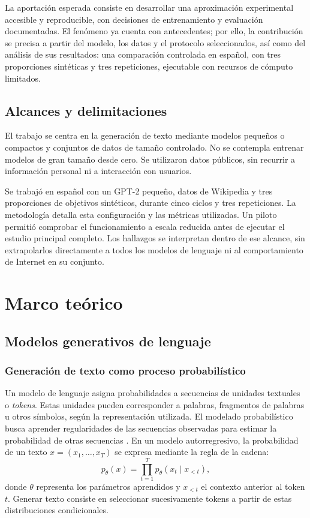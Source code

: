 \documentclass[12pt,letterpaper]{article}
\begin{document}
La aportación esperada consiste en desarrollar una aproximación experimental
accesible y reproducible, con decisiones de entrenamiento y evaluación
documentadas. El fenómeno ya cuenta con antecedentes; por ello, la
contribución se precisa a partir del modelo, los datos y el protocolo
seleccionados, así como del análisis de sus resultados: una comparación
controlada en español, con tres proporciones sintéticas y tres repeticiones,
ejecutable con recursos de cómputo limitados.

\subsection{Alcances y delimitaciones}

El trabajo se centra en la generación de texto mediante modelos pequeños o
compactos y conjuntos de datos de tamaño controlado. No se contempla
entrenar modelos de gran tamaño desde cero. Se utilizaron datos
públicos, sin recurrir a información personal
ni a interacción con usuarios.

Se trabajó en español con un GPT-2 pequeño, datos de Wikipedia y
tres proporciones de objetivos sintéticos, durante cinco ciclos y tres
repeticiones. La metodología detalla esta configuración y las métricas
utilizadas. Un piloto permitió comprobar el funcionamiento a escala reducida
antes de ejecutar el estudio principal completo. Los hallazgos se interpretan dentro de ese alcance,
sin extrapolarlos directamente a todos los modelos de lenguaje ni al
comportamiento de Internet en su conjunto.

\section{Marco teórico}

\subsection{Modelos generativos de lenguaje}

\subsubsection{Generación de texto como proceso probabilístico}

Un modelo de lenguaje asigna probabilidades a secuencias de unidades
textuales o \textit{tokens}. Estas unidades pueden corresponder a palabras,
fragmentos de palabras u otros símbolos, según la representación utilizada.
El modelado probabilístico busca aprender regularidades de las secuencias
observadas para estimar la probabilidad de otras secuencias
\cite{bengio2003}. En un modelo autorregresivo, la probabilidad de un texto
\(x=(x_1,\ldots,x_T)\) se expresa mediante la regla de la cadena:
\begin{equation}
    p_{\theta}(x)=\prod_{t=1}^{T}p_{\theta}(x_t\mid x_{<t}),
\end{equation}
donde \(\theta\) representa los parámetros aprendidos y \(x_{<t}\) el contexto
anterior al token \(t\). Generar texto consiste en seleccionar sucesivamente
tokens a partir de estas distribuciones condicionales.
\end{document}
